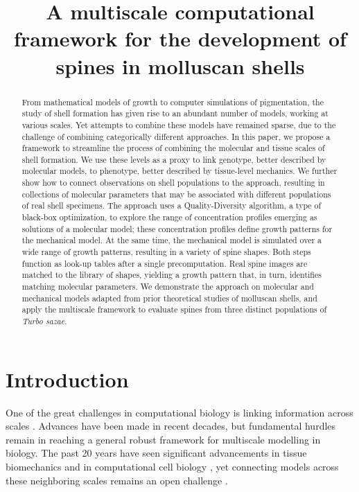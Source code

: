 \documentclass[11pt]{article}
\title{A multiscale computational framework for the development of spines in molluscan shells}
\author{}
\date{}
\begin{document}
\maketitle

\begin{abstract}
From mathematical models of growth to computer simulations of pigmentation, the study of shell formation has given rise to an abundant number of models, working at various scales. Yet attempts to combine these models have remained sparse, due to the challenge of combining categorically different approaches. In this paper, we propose a framework to streamline the process of combining the molecular and tissue scales of shell formation. We use these levels as a proxy to link genotype, better described by molecular models, to phenotype, better described by tissue-level mechanics. We further show how to connect observations on shell populations to the approach, resulting in collections of molecular parameters that may be associated with different populations of real shell specimens. The approach uses a Quality-Diversity algorithm, a type of black-box optimization, to explore the range of concentration profiles emerging as solutions of a molecular model; these concentration profiles define growth patterns for the mechanical model. At the same time, the mechanical model is simulated over a wide range of growth patterns, resulting in a variety of spine shapes. Both steps function as look-up tables after a single precomputation. Real spine images are matched to the library of shapes, yielding a growth pattern that, in turn, identifies matching molecular parameters. We demonstrate the approach on molecular and mechanical models adapted from prior theoretical studies of molluscan shells, and apply the multiscale framework to evaluate spines from three distinct populations of \textit{Turbo sazae}.
\end{abstract}

\section{Introduction}
One of the great challenges in computational biology is linking information across scales \citep{ref1}. Advances have been made in recent decades, but fundamental hurdles remain in reaching a general robust framework for multiscale modelling in biology. The past 20 years have seen significant advancements in tissue biomechanics \citep{ref2} and in computational cell biology \citep{ref3,ref4}, yet connecting models across these neighboring scales remains an open challenge \citep{ref5}.
\end{document}
